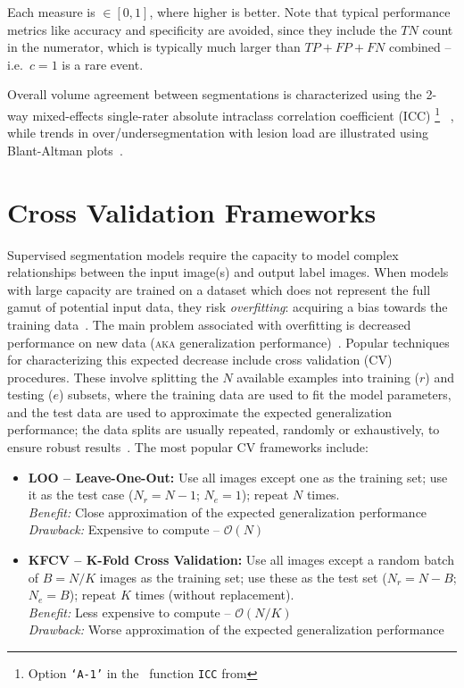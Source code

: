 Each measure is $\in [0,1]$, where higher is better.
Note that typical performance metrics like accuracy and specificity are avoided,
since they include the $TN$ count in the numerator,
which is typically much larger than $TP + FP + FN$ combined -- i.e.\ $c=1$ is a rare event.
\par
Overall volume agreement between segmentations is characterized using
the 2-way mixed-effects single-rater absolute intraclass correlation coefficient (ICC)%
\footnote{Option \texttt{`A-1'} in the \matlab\ function \texttt{ICC} from
  }%
~\cite{Koo2016}, while trends in over/undersegmentation with lesion load
are illustrated using Blant-Altman plots~\cite{Altman1983}.
\section{Cross Validation Frameworks}\label{s:cv-frameworks}
Supervised segmentation models require the capacity to model
complex relationships between the input image(s) and output label images.
When models with large capacity are trained on
a dataset which does not represent the full gamut of potential input data,
they risk \textit{overfitting}: acquiring a bias towards the training data~\cite{Hawkins2004}.
The main problem associated with overfitting is decreased performance on new data
(\textsc{aka} generalization performance)~\cite{Hawkins2004}.
Popular techniques for characterizing this expected decrease include
cross validation (CV) procedures.
These involve splitting the $N$ available examples into training ($r$) and testing ($e$) subsets,
where the training data are used to fit the model parameters,
and the test data are used to approximate the expected generalization performance;
the data splits are usually repeated, randomly or exhaustively,
to ensure robust results~\cite{Arlot2010}.
The most popular CV frameworks include:
\begin{itemize}
  \item\textbf{LOO -- Leave-One-Out:}
  Use all images except one as the training set;
  use it as the test case ($N_r = N-1$; $N_e = 1$);
  repeat $N$ times.
  \\\textit{Benefit:} Close approximation of the expected generalization performance
  \\\textit{Drawback:} Expensive to compute -- $\mathcal{O}(N)$
  \item\textbf{KFCV -- K-Fold Cross Validation:}
  Use all images except a random batch of $B = N/K$ images as the training set;
  use these as the test set ($N_r = N-B$; $N_e = B$);
  repeat $K$ times (without replacement).
  \\\textit{Benefit:} Less expensive to compute -- $\mathcal{O}(N/K)$
  \\\textit{Drawback:} Worse approximation of the expected generalization performance
\end{itemize}
